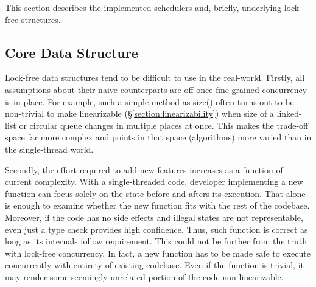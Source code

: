 \documentclass[12pt,a4paper,twoside]{report}
\begin{document}
This section describes the implemented schedulers and, briefly, underlying lock-free structures. 

\subsection{Core Data Structure}

Lock-free data structures tend to be difficult to use in the real-world. Firstly, all assumptions about their naive counterparts are off once fine-grained concurrency is in place. For example, such a simple method as size() often turns out to be non-trivial to make linearizable (\S\ref{section:linearizability}) when size of a linked-list or circular queue changes in multiple places at once. This makes the trade-off space far more complex and points in that space (algorithms) more varied than in the single-thread world.

Secondly, the effort required to add new features increases as a function of current complexity. With a single-threaded code, developer implementing a new function can focus solely on the state before and afters its execution. That alone is enough to examine whether the new function fits with the rest of the codebase. Moreover, if the code has no side effects and illegal states are not representable, even just a type check provides high confidence. Thus, such function is correct as long as its internals follow requirement. This could not be further from the truth with lock-free concurrency. In fact, a new function has to be made safe to execute concurrently with entirety of existing codebase. Even if the function is trivial, it may render some seemingly unrelated portion of the code non-linearizable. 
\end{document}
